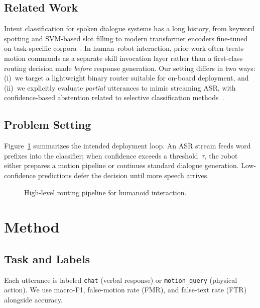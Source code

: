 \documentclass{article}
\begin{document}
\subsection{Related Work}
Intent classification for spoken dialogue systems has a long history, from
keyword spotting and SVM-based slot filling to modern transformer encoders
fine-tuned on task-specific corpora~\cite{louvan2020survey,vaswani2017attention}.
In human--robot interaction, prior work often treats motion commands as a
separate skill invocation layer rather than a first-class routing decision
made \emph{before} response generation.
Our setting differs in two ways: (i)~we target a lightweight binary router
suitable for on-board deployment, and (ii)~we explicitly evaluate
\emph{partial} utterances to mimic streaming ASR, with confidence-based
abstention related to selective classification methods~\cite{geifman2017selective}.

\subsection{Problem Setting}
Figure~\ref{fig:pipeline} summarizes the intended deployment loop.
An ASR stream feeds word prefixes into the classifier; when confidence exceeds
a threshold~$\tau$, the robot either prepares a motion pipeline or continues
standard dialogue generation.
Low-confidence predictions defer the decision until more speech arrives.

\begin{figure}[h]
  \centering
  \caption{High-level routing pipeline for humanoid interaction.}
  \label{fig:pipeline}
\end{figure}

\section{Method}

\subsection{Task and Labels}
Each utterance is labeled \texttt{chat} (verbal response) or
\texttt{motion\_query} (physical action).
We use macro-F1, false-motion rate (FMR), and false-text rate (FTR) alongside
accuracy.
\end{document}
